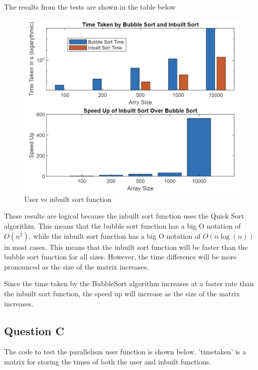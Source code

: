 The results from the tests are shown in the table below


\begin{figure}[H]
 \centering
 \includegraphics[width=0.6\columnwidth]{Figures/noPar}
 \caption{User vs inbuilt sort function}
 \label{fig:noPar}
\end{figure}

These results are logical because the inbuilt sort function uses the Quick Sort algorithm. 
This means that the bubble sort function has a big O notation of $O(n^2)$, while the inbuilt sort function has a big O notation of $O(n\log(n))$ in most cases.
This means that the inbuilt sort function will be faster than the bubble sort function for all sizes.
However, the time difference will be more pronounced as the size of the matrix increases.

Since the time taken by the BubbleSort algorithm increases at a faster rate than the inbuilt sort function, the speed up will increase as the size of the matrix increases.

\subsection{Question C}
The code to test the parallelism  user function is shown below.
'timetaken' is a matrix for storing the times of both the user and inbuilt functions.


